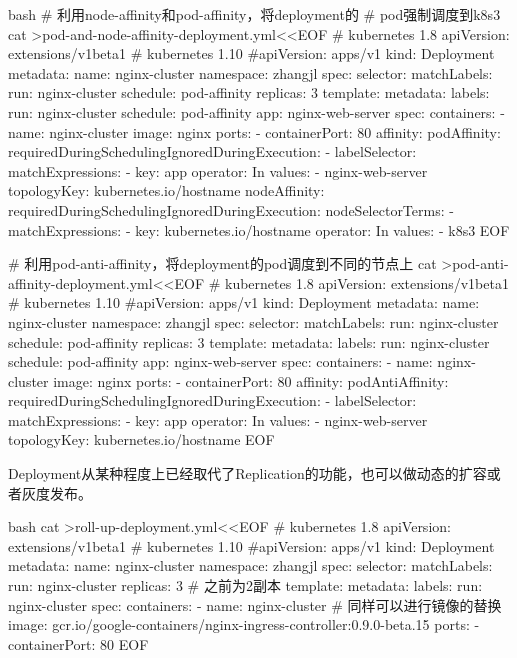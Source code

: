\begin{code-block}{bash}
# 利用node-affinity和pod-affinity，将deployment的
# pod强制调度到k8s3
cat >pod-and-node-affinity-deployment.yml<<EOF
# kubernetes 1.8
apiVersion: extensions/v1beta1
# kubernetes 1.10
#apiVersion: apps/v1
kind: Deployment
metadata:
  name: nginx-cluster
  namespace: zhangjl
spec:
  selector:
    matchLabels:
      run: nginx-cluster
      schedule: pod-affinity
  replicas: 3
  template:
    metadata:
      labels:
        run: nginx-cluster
        schedule: pod-affinity
        app: nginx-web-server
    spec:
      containers:
      - name: nginx-cluster
        image: nginx
        ports:
        - containerPort: 80
      affinity:
        podAffinity:
          requiredDuringSchedulingIgnoredDuringExecution:
          - labelSelector:
              matchExpressions:
              - key: app
                operator: In
                values:
                - nginx-web-server
            topologyKey: kubernetes.io/hostname
        nodeAffinity:
          requiredDuringSchedulingIgnoredDuringExecution:
            nodeSelectorTerms:
            - matchExpressions:
              - key: kubernetes.io/hostname
                operator: In
                values:
                - k8s3
EOF

# 利用pod-anti-affinity，将deployment的pod调度到不同的节点上
cat >pod-anti-affinity-deployment.yml<<EOF
# kubernetes 1.8
apiVersion: extensions/v1beta1
# kubernetes 1.10
#apiVersion: apps/v1
kind: Deployment
metadata:
  name: nginx-cluster
  namespace: zhangjl
spec:
  selector:
    matchLabels:
      run: nginx-cluster
      schedule: pod-affinity
  replicas: 3
  template:
    metadata:
      labels:
        run: nginx-cluster
        schedule: pod-affinity
        app: nginx-web-server
    spec:
      containers:
      - name: nginx-cluster
        image: nginx
        ports:
        - containerPort: 80
      affinity:
        podAntiAffinity:
          requiredDuringSchedulingIgnoredDuringExecution:
          - labelSelector:
              matchExpressions:
              - key: app
                operator: In
                values:
                - nginx-web-server
            topologyKey: kubernetes.io/hostname
EOF
\end{code-block}

Deployment从某种程度上已经取代了Replication的功能，也可以做动态的扩容或者灰度发布。
\begin{code-block}{bash}
cat >roll-up-deployment.yml<<EOF
# kubernetes 1.8
apiVersion: extensions/v1beta1
# kubernetes 1.10
#apiVersion: apps/v1
kind: Deployment
metadata:
  name: nginx-cluster
  namespace: zhangjl
spec:
  selector:
    matchLabels:
      run: nginx-cluster
  replicas: 3    # 之前为2副本
  template:
    metadata:
      labels:
        run: nginx-cluster
    spec:
      containers:
      - name: nginx-cluster
        # 同样可以进行镜像的替换
        image: gcr.io/google-containers/nginx-ingress-controller:0.9.0-beta.15
        ports:
        - containerPort: 80
EOF
\end{code-block}

